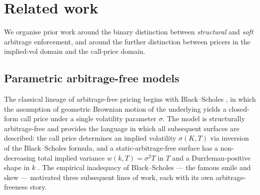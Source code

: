 \documentclass[largeformat]{interact}
\let\cite\citep   %
\theoremstyle{plain}
\theoremstyle{definition}
\newcommand{\bs}{Black--Scholes}
\begin{document}
\section{Related work}
\label{sec:related-work}

We organise prior work around the binary distinction between \emph{structural} and \emph{soft} arbitrage enforcement, and around the further distinction between pricers in the implied-vol domain and the call-price domain.

\subsection{Parametric arbitrage-free models}
\label{sec:related-parametric}

The classical lineage of arbitrage-free pricing begins with \bs{} \cite{black1973pricing,merton1973theory}, in which the assumption of geometric Brownian motion of the underlying yields a closed-form call price under a single volatility parameter $\sigma$. The model is structurally arbitrage-free and provides the language in which all subsequent surfaces are described: the call price determines an implied volatility $\sigma(K, T)$ via inversion of the \bs{} formula, and a static-arbitrage-free surface has a non-decreasing total implied variance $w(k, T) = \sigma^2 T$ in $T$ and a Durrleman-positive shape in $k$ \cite{jacquier2014arbitrage,gatheral2014arbitrage}. The empirical inadequacy of \bs{} --- the famous smile and skew \cite{rebonato1999volatility} --- motivated three subsequent lines of work, each with its own arbitrage-freeness story.
\end{document}

